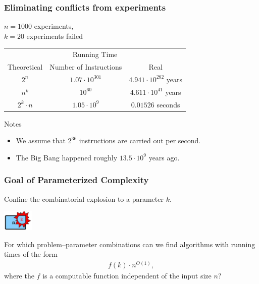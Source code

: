\begin{frame}
  \frametitle{Eliminating conflicts from experiments}
  \noindent
  $n = 1000$ experiments,\\
  $k = 20$ experiments failed\\
  \bigskip
  
  \begin{center}
  \begin{tabular}{c c c}
   \toprule
   \multicolumn{3}{c}{Running Time}\\
   Theoretical & Number of Instructions & Real\\
   \midrule
   $2^n$ & $1.07 \cdot 10^{301}$ & $4.941 \cdot 10^{282}$ years\\
   $n^k$ & $10^{60}$  & $4.611 \cdot 10^{41}$  years\\
   $2^k \cdot n$ & $1.05 \cdot 10^9$ & $0.01526$ seconds\\
   \bottomrule
  \end{tabular}
  \end{center}

  \bigskip
  \noindent
  Notes
  \begin{itemize}
   \item We assume that $2^{36}$ instructions are carried out per second.
   \item The Big Bang happened roughly $13.5\cdot 10^9$ years ago.
  \end{itemize}
\end{frame}

\begin{frame}
 \frametitle{Goal of Parameterized Complexity}

 \noindent
 Confine the combinatorial explosion to a parameter $k$.\\
 \bigskip

 \begin{center}
  \includegraphics[height=1cm]{pc.jpg}
 \end{center}

 \bigskip
 \noindent
 For which problem--parameter combinations can we find algorithms with running times of the form
 \begin{align*}
  f(k) \cdot n^{O(1)},
 \end{align*}
 where the $f$ is a computable function independent of the input size $n$?

\end{frame}

